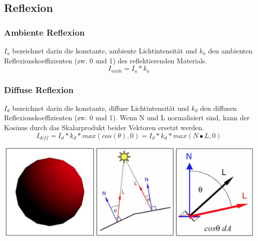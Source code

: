 \documentclass[10pt]{article}
\begin{document}
\subsection{Reflexion}
\subsubsection{Ambiente Reflexion}
$I_a$ bezeichnet darin die konstante, ambiente Lichtintensität und $k_a$ den ambienten Reflexionskoeffizienten (zw. 0 und 1) des reflektierenden Materials. 
\begin{equation}
I_{ambi}=I_a * k_a
\end{equation}
\subsubsection{Diffuse Reflexion}
$I_d$ bezeichnet darin die konstante, diffuse Lichtintensität und $k_d$ den diffusen Reflexionskoeffizienten (zw. 0 und 1). Wenn N und L normalisiert sind, kann der Kosinus durch das Skalarprodukt beider Vektoren ersetzt werden.
\begin{equation}
I_{diff}=I_d * k_d * max( cos(\theta), 0) = I_d * k_d * max(N \bullet L, 0)
\end{equation}
\begin{center}
	\includegraphics[scale=0.4]{diffuse_reflexion.png}
\end{center}
\end{document}
